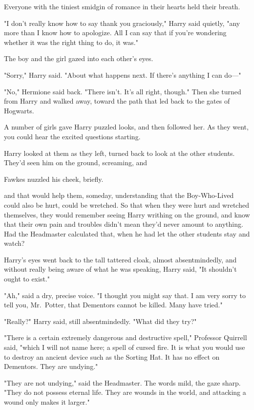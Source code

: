 Everyone with the tiniest smidgin of romance in their hearts held their breath.

"I don't really know how to say thank you graciously," Harry said quietly, "any
more than I know how to apologize. All I can say that if you're wondering
whether it was the right thing to do, it was."

The boy and the girl gazed into each other's eyes.

"Sorry," Harry said. "About what happens next. If there's anything I can do—"

"No," Hermione said back. "There isn't. It's all right, though." Then she
turned from Harry and walked away, toward the path that led back to the gates
of Hogwarts.

A number of girls gave Harry puzzled looks, and then followed her. As they
went, you could hear the excited questions starting.

Harry looked at them as they left, turned back to look at the other students.
They'd seen him on the ground, screaming, and{\el}

Fawkes nuzzled his cheek, briefly.

{\el} and that would help them, someday, understanding that the Boy-Who-Lived
could also be hurt, could be wretched. So that when they were hurt and wretched
themselves, they would remember seeing Harry writhing on the ground, and know
that their own pain and troubles didn't mean they'd never amount to anything.
Had the Headmaster calculated that, when he had let the other students stay and
watch?

Harry's eyes went back to the tall tattered cloak, almost absentmindedly, and
without really being aware of what he was speaking, Harry said, "It shouldn't
ought to exist."

"Ah," said a dry, precise voice. "I thought you might say that. I am very sorry
to tell you, Mr.~Potter, that Dementors cannot be killed. Many have tried."

"Really?" Harry said, still absentmindedly. "What did they try?"

"There is a certain extremely dangerous and destructive spell," Professor
Quirrell said, "which I will not name here; a spell of cursed fire. It is what
you would use to destroy an ancient device such as the Sorting Hat. It has no
effect on Dementors. They are undying."

"They are not undying," said the Headmaster. The words mild, the gaze sharp.
"They do not possess eternal life. They are wounds in the world, and attacking
a wound only makes it larger."

